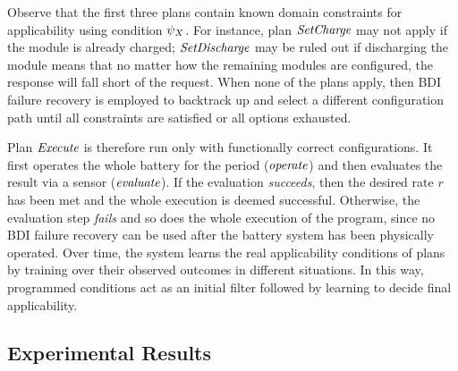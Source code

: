 Observe that the first three plans contain known domain constraints for applicability using condition $\psi_X$. For instance, plan $\operatorname{\textit{SetCharge}}$ may not apply if the module is already charged; $\operatorname{\textit{SetDischarge}}$ may be ruled out if discharging the module means that no matter how the remaining modules are configured, the response will fall short of the request. When none of the plans apply, then BDI failure recovery is employed to backtrack up and select a different configuration path until all constraints are satisfied or all options exhausted. 

Plan $\operatorname{\textit{Execute}}$ is therefore run only with functionally correct configurations. It first operates the whole battery for the period ($\operatorname{\textit{operate}}$) and then evaluates the result via a sensor ($\operatorname{\textit{evaluate}}$). If the evaluation \emph{succeeds}, then the desired rate $r$ has been met and the whole execution is deemed successful. Otherwise, the evaluation step \emph{fails} and so does the whole execution of the program, since no BDI failure recovery can be used after the battery system has been physically operated. 
%
Over time, the system learns the real applicability conditions of plans by training over their observed outcomes in different situations. In this way, programmed conditions act as an initial filter followed by learning
to decide final applicability.

\subsection{Experimental Results}\label{sec:results}

